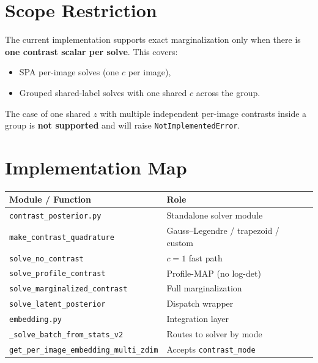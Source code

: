 \documentclass[11pt]{article}
\begin{document}
\section{Scope Restriction}
\label{sec:scope}

The current implementation supports exact marginalization only when there
is \textbf{one contrast scalar per solve}.  This covers:
\begin{itemize}
  \item SPA per-image solves (one $c$ per image),
  \item Grouped shared-label solves with one shared $c$ across the group.
\end{itemize}

The case of one shared $z$ with multiple independent per-image contrasts
inside a group is \textbf{not supported} and will raise
\texttt{NotImplementedError}.

\section{Implementation Map}
\label{sec:code}

\begin{center}
\begin{tabular}{ll}
\toprule
Module / Function & Role \\
\midrule
\texttt{contrast\_posterior.py} & Standalone solver module \\
\quad \texttt{make\_contrast\_quadrature} & Gauss--Legendre / trapezoid / custom \\
\quad \texttt{solve\_no\_contrast} & $c=1$ fast path \\
\quad \texttt{solve\_profile\_contrast} & Profile-MAP (no log-det) \\
\quad \texttt{solve\_marginalized\_contrast} & Full marginalization \\
\quad \texttt{solve\_latent\_posterior} & Dispatch wrapper \\
\midrule
\texttt{embedding.py} & Integration layer \\
\quad \texttt{\_solve\_batch\_from\_stats\_v2} & Routes to solver by mode \\
\quad \texttt{get\_per\_image\_embedding\_multi\_zdim} & Accepts \texttt{contrast\_mode} \\
\bottomrule
\end{tabular}
\end{center}
\end{document}
